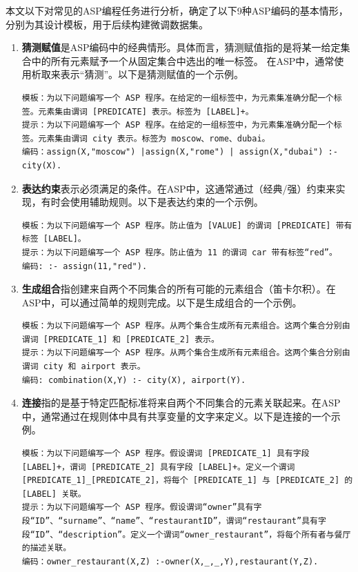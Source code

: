 本文以下对常见的ASP编程任务进行分析，确定了以下9种ASP编码的基本情形，分别为其设计模板，用于后续构建微调数据集。
\begin{enumerate}[nosep]
\item \textbf{猜测赋值}是ASP编码中的经典情形。具体而言，猜测赋值指的是将某一给定集合中的所有元素赋予一个从固定集合中选出的唯一标签。
在ASP中，通常使用析取来表示“猜测”。以下是猜测赋值的一个示例。
\begin{lstlisting}
模板：为以下问题编写一个 ASP 程序。在给定的一组标签中，为元素集准确分配一个标签。元素集由谓词 [PREDICATE] 表示。标签为 [LABEL]+。
提示：为以下问题编写一个 ASP 程序。在给定的一组标签中，为元素集准确分配一个标签。元素集由谓词 city 表示。标签为 moscow、rome、dubai。
编码：assign(X,"moscow") |assign(X,"rome") | assign(X,"dubai") :- city(X).
\end{lstlisting}
\item \textbf{表达约束}表示必须满足的条件。在ASP中，这通常通过（经典/强）约束来实现，有时会使用辅助规则。以下是表达约束的一个示例。
\begin{lstlisting}
模板：为以下问题编写一个 ASP 程序。防止值为 [VALUE] 的谓词 [PREDICATE] 带有标签 [LABEL]。
提示：为以下问题编写一个 ASP 程序。防止值为 11 的谓词 car 带有标签“red”。
编码: :- assign(11,"red").
\end{lstlisting}
\item \textbf{生成组合}指创建来自两个不同集合的所有可能的元素组合（笛卡尔积）。在ASP中，可以通过简单的规则完成。以下是生成组合的一个示例。
\begin{lstlisting}
模板：为以下问题编写一个 ASP 程序。从两个集合生成所有元素组合。这两个集合分别由谓词 [PREDICATE_1] 和 [PREDICATE_2] 表示。
提示：为以下问题编写一个 ASP 程序。从两个集合生成所有元素组合。这两个集合分别由谓词 city 和 airport 表示。
编码: combination(X,Y) :- city(X), airport(Y).
\end{lstlisting}
\item \textbf{连接}指的是基于特定匹配标准将来自两个不同集合的元素关联起来。在ASP中，通常通过在规则体中具有共享变量的文字来定义。以下是连接的一个示例。
\begin{lstlisting}
模板：为以下问题编写一个 ASP 程序。假设谓词 [PREDICATE_1] 具有字段 [LABEL]+，谓词 [PREDICATE_2] 具有字段 [LABEL]+。定义一个谓词 [PREDICATE_1]_[PREDICATE_2]，将每个 [PREDICATE_1] 与 [PREDICATE_2] 的 [LABEL] 关联。
提示：为以下问题编写一个 ASP 程序。假设谓词“owner”具有字段“ID”、“surname”、“name”、“restaurantID”，谓词“restaurant”具有字段“ID”、“description”。定义一个谓词“owner_restaurant”，将每个所有者与餐厅的描述关联。
编码：owner_restaurant(X,Z) :-owner(X,_,_,Y),restaurant(Y,Z).

\end{lstlisting}
\end{enumerate}
